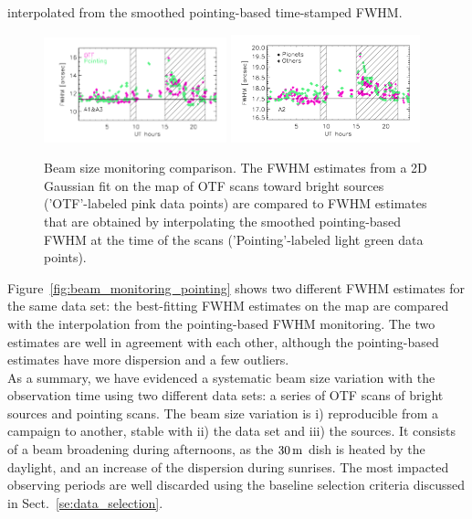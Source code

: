 interpolated from the smoothed pointing-based time-stamped FWHM.
%
\begin{figure}[ht!]
  \begin{center}
    \includegraphics[clip=true, trim={0.9cm, 0.5cm, 0.5cm, 0.5cm}, width=0.4725\textwidth]{Figures/Beams/Beam_monitoring_with_otfs_vs_ut_compare_pointings_1mm.pdf}
    \includegraphics[clip=true, trim={0.5cm, 0.5cm, 0.5cm, 0.5cm}, width=0.4875\textwidth]{Figures/Beams/Beam_monitoring_with_otfs_vs_ut_compare_pointings_a2.pdf}
    \caption[Beam size monitoring comparison]{Beam size monitoring
      comparison. The FWHM estimates from a 2D Gaussian fit on the map
      of OTF scans toward bright sources ('OTF'-labeled pink data
      points) are compared to FWHM estimates that are obtained by
      interpolating the smoothed pointing-based FWHM at the time of
      the scans ('Pointing'-labeled light green data points).}
\label{fig:beam_monitoring_compare}
\end{center}
\end{figure}
%
Figure~\ref{fig:beam_monitoring_pointing} shows two different FWHM
estimates for the same data set: the best-fitting FWHM estimates on
the map are compared with the interpolation from the pointing-based
FWHM monitoring. The two estimates are well in agreement with each
other, although the pointing-based estimates have more dispersion and
a few outliers.\\

As a summary, we have evidenced a systematic beam size variation with
the observation time using two different data sets: a series of OTF
scans of bright sources and pointing scans. The beam size
variation is i) reproducible from a campaign to another, stable
with ii) the data set and iii) the sources. It consists of a beam
broadening during afternoons, as the $30\,\rm{m}$ dish is heated by
the daylight, and
an increase of the dispersion during sunrises. The most impacted
observing periods are well discarded using the baseline selection
criteria discussed in Sect.~\ref{se:data_selection}.





